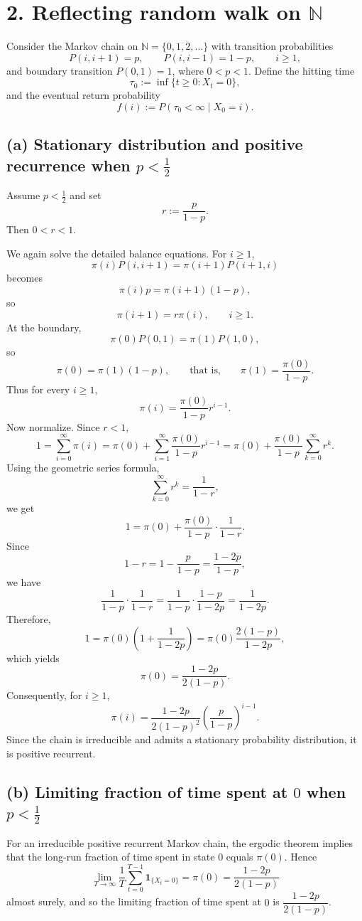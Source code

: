 \documentclass[11pt]{article}
\begin{document}
\newpage
\section*{2. Reflecting random walk on $\mathbb N$}

Consider the Markov chain on $\mathbb N=\{0,1,2,\dots\}$ with transition probabilities
\[
P(i,i+1)=p,\qquad P(i,i-1)=1-p,\qquad i\ge1,
\]
and boundary transition $P(0,1)=1$, where $0<p<1$. Define the hitting time
\[
\tau_0:=\inf\{t\ge0:X_t=0\},
\]
and the eventual return probability
\[
f(i):=P(\tau_0<\infty\mid X_0=i).
\]

\subsection*{(a) Stationary distribution and positive recurrence when $p<\tfrac12$}
Assume $p<\frac12$ and set
\[
r:=\frac{p}{1-p}.
\]
Then $0<r<1$.

We again solve the detailed balance equations. For $i\ge1$,
\[
\pi(i)P(i,i+1)=\pi(i+1)P(i+1,i)
\]
becomes
\[
\pi(i)p=\pi(i+1)(1-p),
\]
so
\[
\pi(i+1)=r\pi(i),\qquad i\ge1.
\]
At the boundary,
\[
\pi(0)P(0,1)=\pi(1)P(1,0),
\]
so
\[
\pi(0)=\pi(1)(1-p),
\qquad\text{that is,}\qquad
\pi(1)=\frac{\pi(0)}{1-p}.
\]
Thus for every $i\ge1$,
\[
\pi(i)=\frac{\pi(0)}{1-p}r^{i-1}.
\]
Now normalize. Since $r<1$,
\[
1=\sum_{i=0}^{\infty}\pi(i)=\pi(0)+\sum_{i=1}^{\infty}\frac{\pi(0)}{1-p}r^{i-1}
=\pi(0)+\frac{\pi(0)}{1-p}\sum_{k=0}^{\infty}r^k.
\]
Using the geometric series formula,
\[
\sum_{k=0}^{\infty}r^k=\frac{1}{1-r},
\]
we get
\[
1=\pi(0)+\frac{\pi(0)}{1-p}\cdot\frac{1}{1-r}.
\]
Since
\[
1-r=1-\frac{p}{1-p}=\frac{1-2p}{1-p},
\]
we have
\[
\frac{1}{1-p}\cdot\frac{1}{1-r}=\frac{1}{1-p}\cdot\frac{1-p}{1-2p}=\frac{1}{1-2p}.
\]
Therefore,
\[
1=\pi(0)\left(1+\frac{1}{1-2p}\right)=\pi(0)\frac{2(1-p)}{1-2p},
\]
which yields
\[
\pi(0)=\frac{1-2p}{2(1-p)}.
\]
Consequently, for $i\ge1$,
\[
\pi(i)=\frac{1-2p}{2(1-p)^2}\left(\frac{p}{1-p}\right)^{i-1}.
\]
Since the chain is irreducible and admits a stationary probability distribution, it is positive recurrent.

\subsection*{(b) Limiting fraction of time spent at $0$ when $p<\tfrac12$}
For an irreducible positive recurrent Markov chain, the ergodic theorem implies that the long-run fraction of time spent in state $0$ equals $\pi(0)$. Hence
\[
\lim_{T\to\infty}\frac1T\sum_{t=0}^{T-1}\mathbf 1_{\{X_t=0\}}=\pi(0)=\frac{1-2p}{2(1-p)}
\]
almost surely, and so the limiting fraction of time spent at $0$ is $\dfrac{1-2p}{2(1-p)}$.
\end{document}
